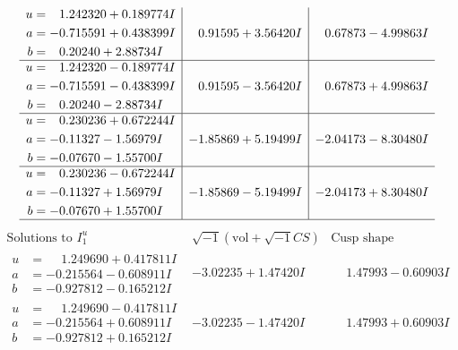 \documentclass[1p]{elsarticle_modified}
\theoremstyle{definition}
\newcommand{\I}{\sqrt{-1}}
\begin{document}
$$\begin{array}{c|c|c}
\begin{aligned}
u &= \phantom{-}1.242320 + 0.189774 I \\
a &= -0.715591 + 0.438399 I \\
b &= \phantom{-}0.20240 + 2.88734 I\end{aligned}
 & \phantom{-}0.91595 + 3.56420 I & \phantom{-}0.67873 - 4.99863 I \\ \hline\begin{aligned}
u &= \phantom{-}1.242320 - 0.189774 I \\
a &= -0.715591 - 0.438399 I \\
b &= \phantom{-}0.20240 - 2.88734 I\end{aligned}
 & \phantom{-}0.91595 - 3.56420 I & \phantom{-}0.67873 + 4.99863 I \\ \hline\begin{aligned}
u &= \phantom{-}0.230236 + 0.672244 I \\
a &= -0.11327 - 1.56979 I \\
b &= -0.07670 - 1.55700 I\end{aligned}
 & -1.85869 + 5.19499 I & -2.04173 - 8.30480 I \\ \hline\begin{aligned}
u &= \phantom{-}0.230236 - 0.672244 I \\
a &= -0.11327 + 1.56979 I \\
b &= -0.07670 + 1.55700 I\end{aligned}
 & -1.85869 - 5.19499 I & -2.04173 + 8.30480 I\\
 \hline 
 \end{array}$$\newpage$$\begin{array}{c|c|c}  
\text{Solutions to }I^u_{1}& \I (\text{vol} + \sqrt{-1}CS) & \text{Cusp shape}\\
 \hline 
\begin{aligned}
u &= \phantom{-}1.249690 + 0.417811 I \\
a &= -0.215564 - 0.608911 I \\
b &= -0.927812 - 0.165212 I\end{aligned}
 & -3.02235 + 1.47420 I & \phantom{-}1.47993 - 0.60903 I \\ \hline\begin{aligned}
u &= \phantom{-}1.249690 - 0.417811 I \\
a &= -0.215564 + 0.608911 I \\
b &= -0.927812 + 0.165212 I\end{aligned}
 & -3.02235 - 1.47420 I & \phantom{-}1.47993 + 0.60903 I \\ \hline\begin{aligned}

\end{aligned}
\end{array}$$
\end{document}
